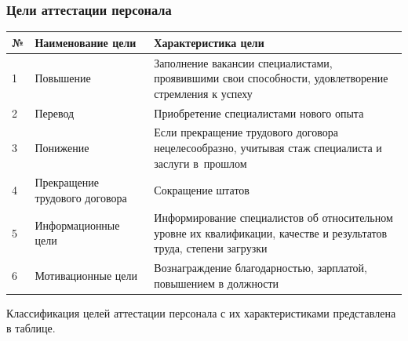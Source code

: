 \documentclass{../industrial-development}
\begin{document}
\begin{frame} \frametitle{Цели аттестации персонала}
    
\begin{table}[h]
\begin{center}
\begin{tabular}{|p{}|p{4cm}|p{5cm}|}
\hline
\tiny \textbf{№} & \tiny \textbf{Наименование цели} & \tiny \textbf{Характеристика цели} \\
\hline
\tiny 1 & \tiny Повышение & \tiny Заполнение вакансии специалистами, проявившими свои способности, удовлетворение стремления к успеху \\
\hline
\tiny 2 & \tiny Перевод & \tiny Приобретение специалистами нового опыта \\
\hline
\tiny 3 & \tiny Понижение & \tiny Если прекращение трудового договора нецелесообразно, учитывая стаж специалиста и заслуги в~прошлом \\
\hline
\tiny 4 & \tiny Прекращение трудового договора &
\tiny Сокращение штатов \\
\hline
\tiny 5 & \tiny Информационные цели & \tiny Информирование специалистов об относительном уровне их квалификации, качестве и результатов труда, степени загрузки \\
\hline
\tiny 6  & \tiny Мотивационные цели & \tiny Вознаграждение благодарностью, зарплатой, повышением в должности \\
\hline
\end{tabular}
\end{center}
\end{table}

\end{frame}

\lecturenotes

Классификация целей аттестации персонала с их характеристиками представлена в таблице.
\end{document}
